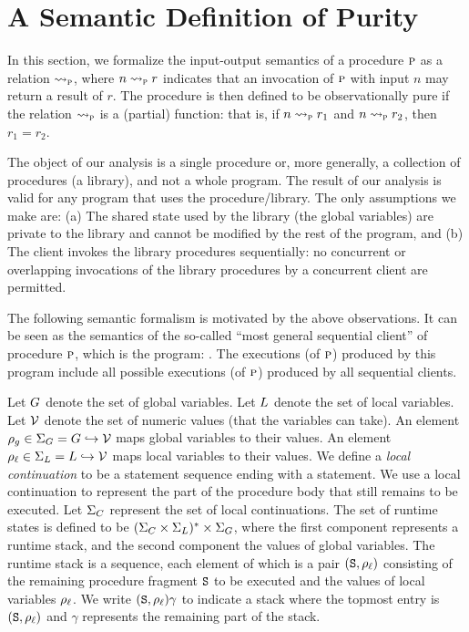 \section{A Semantic Definition of Purity}
\label{sec:semantics}

In this section, we formalize the input-output semantics of a procedure $\textsc{p}$ as a relation $\rightsquigarrow_{\textsc{p}}$,
where $n \rightsquigarrow_{\textsc{p}} r$ indicates that an invocation of $\textsc{p}$ with input $n$ may return a result of $r$.
The procedure is then defined to be observationally pure if the relation $\rightsquigarrow_{\textsc{p}}$ is a (partial) function:
that is, if  $n \rightsquigarrow_{\textsc{p}} r_1$ and $n \rightsquigarrow_{\textsc{p}} r_2$, then $r_1 = r_2$.

The object of our analysis is a single procedure or, more generally, a collection of procedures (a library),
and not a whole program. The result of our analysis is valid for any program that uses the procedure/library.
The only assumptions we make are: (a) The shared state used by the library (the global variables) are private
to the library and cannot be modified by the rest of the program, and (b) The client invokes the library
procedures sequentially: no concurrent or overlapping invocations of the library procedures by a concurrent
client are permitted.

The following semantic formalism is motivated by the above observations. It can be seen as the semantics
of the so-called ``most general sequential client'' of procedure $\textsc{p}$, which is the program:
.
The executions (of $\textsc{p}$) produced by this program include all possible executions (of $\textsc{p}$)  produced by all
sequential clients.

Let $G$ denote the set of global variables. Let $L$ denote the set of local variables.
Let $\mathcal{V}$ denote the set of numeric values (that the variables can take).
An element $\rho_g \in \Sigma_G = G \hookrightarrow \mathcal{V}$ maps global variables to their values.
An element $\rho_\ell \in \Sigma_L = L \hookrightarrow \mathcal{V}$ maps local variables to their values.
We define a \emph{local continuation} to be a statement sequence ending with a  statement.
We use a local continuation to represent the part of the procedure body that still remains to be
executed. Let $\Sigma_C$ represent the set of local continuations.
The set of runtime states is defined to be $(\Sigma_C \times \Sigma_L)^* \times \Sigma_G$, where
the first component represents a runtime stack, and the second component the values of global
variables. The runtime stack is a sequence, each element of which is a pair $(\texttt{S},\rho_\ell)$ consisting of the
remaining procedure fragment $\texttt{S}$ to be executed and the values of local variables $\rho_\ell$.
We write $(\texttt{S},\rho_\ell)\gamma$ to indicate a stack where the topmost entry is $(\texttt{S},\rho_\ell)$
and $\gamma$ represents the remaining part of the stack.

